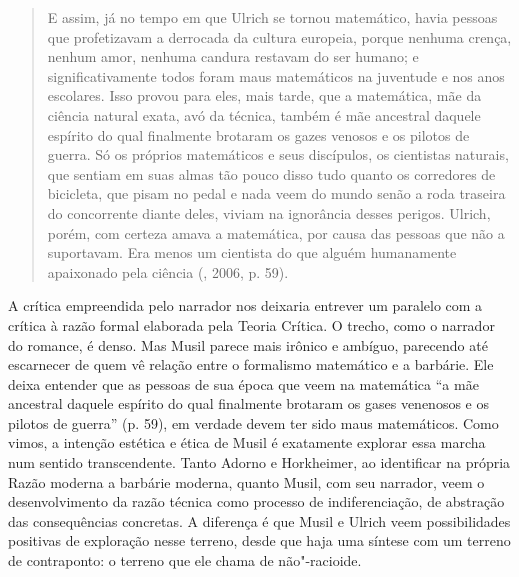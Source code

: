 \begin{quote}
E assim, já no tempo em que Ulrich se tornou matemático, havia pessoas
que profetizavam a derrocada da cultura europeia, porque nenhuma crença,
nenhum amor, nenhuma candura restavam do ser humano; e
significativamente todos foram maus matemáticos na juventude e nos anos
escolares. Isso provou para eles, mais tarde, que a matemática, mãe da
ciência natural exata, avó da técnica, também é mãe ancestral daquele
espírito do qual finalmente brotaram os gazes venosos e os pilotos de
guerra. Só os próprios matemáticos e seus discípulos, os cientistas
naturais, que sentiam em suas almas tão pouco disso tudo quanto os
corredores de bicicleta, que pisam no pedal e nada veem do mundo senão a
roda traseira do concorrente diante deles, viviam na ignorância desses
perigos. Ulrich, porém, com certeza amava a matemática, por causa das
pessoas que não a suportavam. Era menos um cientista do que alguém
humanamente apaixonado pela ciência (, 2006, p. 59).
\end{quote}

A crítica empreendida pelo narrador nos deixaria entrever um paralelo
com a crítica à razão formal elaborada pela Teoria Crítica. O trecho,
como o narrador do romance, é denso. Mas Musil parece mais irônico e
ambíguo, parecendo até escarnecer de quem vê relação entre o formalismo
matemático e a barbárie. Ele deixa entender que as pessoas de sua época
que veem na matemática ``a mãe ancestral daquele espírito do qual
finalmente brotaram os gases venenosos e os pilotos de guerra'' (p. 59),
em verdade devem ter sido maus matemáticos. Como vimos, a intenção
estética e ética de Musil é exatamente explorar essa marcha num sentido
transcendente. Tanto Adorno e Horkheimer, ao identificar na própria
Razão moderna a barbárie moderna, quanto Musil, com seu narrador, veem o
desenvolvimento da razão técnica como processo de indiferenciação, de
abstração das consequências concretas. A diferença é que Musil e Ulrich
veem possibilidades positivas de exploração nesse terreno, desde que
haja uma síntese com um terreno de contraponto: o terreno que ele chama
de não"-racioide.

